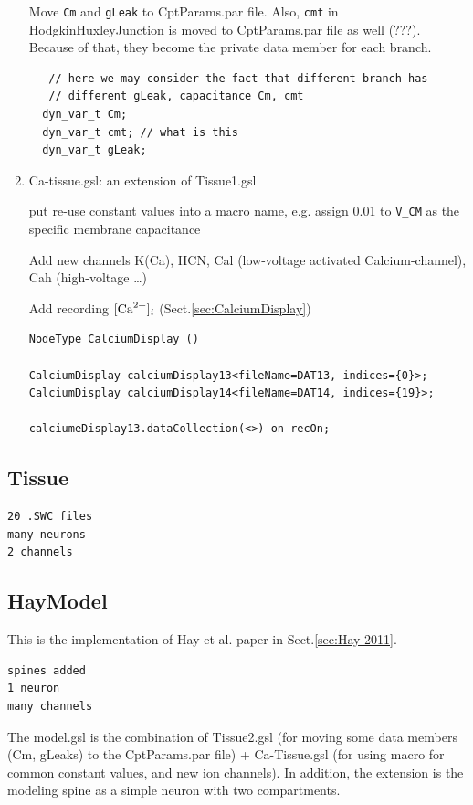 \begin{enumerate}
Move \verb!Cm! and \verb!gLeak! to CptParams.par
file. Also, \verb!cmt! in HodgkinHuxleyJunction is moved to CptParams.par file
as well (???). Because of that, they become the private data member for each
branch.
\begin{verbatim}
   // here we may consider the fact that different branch has 
   // different gLeak, capacitance Cm, cmt
  dyn_var_t Cm;
  dyn_var_t cmt; // what is this
  dyn_var_t gLeak;
\end{verbatim}

  
  \item Ca-tissue.gsl: an extension of Tissue1.gsl
  
  put re-use constant values into a macro name, e.g.
  assign 0.01 to \verb!V_CM! as the specific membrane capacitance

Add new channels K(Ca), HCN, Cal (low-voltage activated Calcium-channel), Cah
(high-voltage \ldots)

Add recording $[{\text{Ca}^{2+}}]_i$ (Sect.\ref{sec:CalciumDisplay})
\begin{verbatim}
NodeType CalciumDisplay ()

CalciumDisplay calciumDisplay13<fileName=DAT13, indices={0}>;
CalciumDisplay calciumDisplay14<fileName=DAT14, indices={19}>;

calciumeDisplay13.dataCollection(<>) on recOn;
\end{verbatim}



\end{enumerate}

\subsection{Tissue}

\begin{verbatim}
20 .SWC files
many neurons
2 channels
\end{verbatim}


\subsection{HayModel}
\label{sec:HayModel-NTS}

This is the implementation of Hay et al. paper in Sect.\ref{sec:Hay-2011}.
\begin{verbatim}
spines added
1 neuron
many channels
\end{verbatim}

The model.gsl is the combination of Tissue2.gsl (for moving some data members
(Cm, gLeaks) to the CptParams.par file) + Ca-Tissue.gsl (for using macro for
common constant values, and new ion channels). In addition, the extension is the
modeling spine as a simple neuron with two compartments. 


